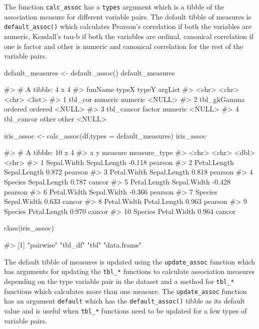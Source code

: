 The function \texttt{calc\_assoc} has a \texttt{types} argument which is
a tibble of the association measure for different variable pairs. The
default tibble of measures is \texttt{default\_assoc()} which calculates
Pearson's correlation if both the variables are numeric, Kendall's tau-b
if both the variables are ordinal, canonical correlation if one is
factor and other is numeric and canonical correlation for the rest of
the variable pairs.

\begin{Schunk}
\begin{Sinput}
default_measures <- default_assoc()
default_measures
\end{Sinput}
\begin{Soutput}
#> # A tibble: 4 x 4
#>   funName     typeX   typeY   argList
#>   <chr>       <chr>   <chr>   <list> 
#> 1 tbl_cor     numeric numeric <NULL> 
#> 2 tbl_gkGamma ordered ordered <NULL> 
#> 3 tbl_cancor  factor  numeric <NULL> 
#> 4 tbl_cancor  other   other   <NULL>
\end{Soutput}
\begin{Sinput}
iris_assoc <- calc_assoc(df,types = default_measures)
iris_assoc
\end{Sinput}
\begin{Soutput}
#> # A tibble: 10 x 4
#>    x            y            measure measure_type
#>    <chr>        <chr>          <dbl> <chr>       
#>  1 Sepal.Width  Sepal.Length  -0.118 pearson     
#>  2 Petal.Length Sepal.Length   0.872 pearson     
#>  3 Petal.Width  Sepal.Length   0.818 pearson     
#>  4 Species      Sepal.Length   0.787 cancor      
#>  5 Petal.Length Sepal.Width   -0.428 pearson     
#>  6 Petal.Width  Sepal.Width   -0.366 pearson     
#>  7 Species      Sepal.Width    0.633 cancor      
#>  8 Petal.Width  Petal.Length   0.963 pearson     
#>  9 Species      Petal.Length   0.970 cancor      
#> 10 Species      Petal.Width    0.964 cancor
\end{Soutput}
\begin{Sinput}
class(iris_assoc)
\end{Sinput}
\begin{Soutput}
#> [1] "pairwise"   "tbl_df"     "tbl"        "data.frame"
\end{Soutput}
\end{Schunk}

The default tibble of measures is updated using the
\texttt{update\_assoc} function which has arguments for updating the
\texttt{tbl\_*} functions to calculate association measures depending on
the type variable pair in the dataset and a method for \texttt{tbl\_*}
functions which calculates more than one measure. The
\texttt{update\_assoc} function has an argument \texttt{default} which
has the \texttt{default\_assoc()} tibble as its default value and is
useful when \texttt{tbl\_*} functions need to be updated for a few types
of variable pairs.

